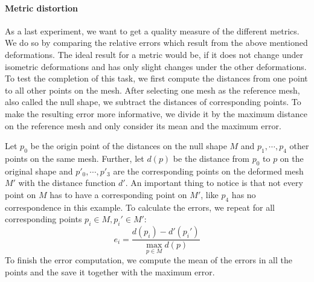 \paragraph{Metric distortion}
As a last experiment, we want to get a quality measure of the different metrics.
We do so by comparing the relative errors which result from the above mentioned deformations.
The ideal result for a metric would be, if it does not change under isometric deformations and has only slight changes under the other deformations.
To test the completion of this task, we first compute the distances from one point to all other points on the mesh.
After selecting one mesh as the reference mesh, also called the null shape, we subtract the distances of corresponding points.
To make the resulting error more informative, we divide it by the maximum distance on the reference mesh and only consider its mean and the maximum error.
\begin{example}
	Let $p_0$ be the origin point of the distances on the null shape $M$ and $p_1,\cdots,p_4$ other points on the same mesh.
	Further, let $d(p)$ be the distance from $p_0$ to $p$ on the original shape and $p'_0, \cdots, p'_3$ are the corresponding points on the deformed mesh $M'$ with the distance function $d'$.
	An important thing to notice is that not every point on $M$ has to have a corresponding point on $M'$, like $p_4$ has no correspondence in this example.
	To calculate the errors, we repeat for all corresponding points $p_i\in M, p_i' \in M'$:
	$$e_i = \frac{d(p_i) - d'(p_i')}{\max_{p\in M} d(p)}$$
	\noindent To finish the error computation, we compute the mean of the errors in all the points and the save it together with the maximum error.
\end{example}

